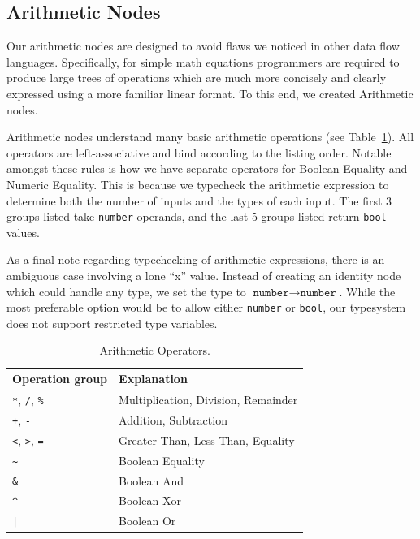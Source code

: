 \documentclass[12pt,UTF8,a4]{article}
\newcommand{\code}[1]{\texttt{#1}}
\newcommand{\type}[1]{\texttt{#1}}
\begin{document}
\clearpage

\subsection{Arithmetic Nodes}
Our arithmetic nodes are designed to avoid flaws we noticed in other
data flow languages. Specifically, for simple math equations
programmers are required to produce large trees of operations which
are much more concisely and clearly expressed using a more familiar
linear format. To this end, we created Arithmetic nodes.

Arithmetic nodes understand many basic arithmetic operations (see
Table~\ref{tab:arithops}). All operators are left-associative and
bind according to the listing order. Notable amongst these rules is
how we have separate operators for Boolean Equality and Numeric
Equality. This is because we typecheck the arithmetic expression to
determine both the number of inputs and the types of each input. The
first 3 groups listed take \type{number} operands, and the last 5
groups listed return \type{bool} values.

As a final note regarding typechecking of arithmetic expressions,
there is an ambiguous case involving a lone ``x'' value. Instead of
creating an identity node which could handle any type, we set the type
to $\type{number} \rightarrow \type{number}$. While the most
preferable option would be to allow either \type{number} or
\type{bool}, our typesystem does not support restricted type
variables.

\begin{table}
\center
\begin{tabular}{l|l}
\hline
Operation group & Explanation \\
\hline
\code{*}, \code{/}, \code{\%} & Multiplication, Division, Remainder \\
\code{+}, \code{-} & Addition, Subtraction \\
\code{\textless}, \code{\textgreater}, \code{=} & Greater Than, Less Than, Equality \\
\code{\textasciitilde} & Boolean Equality \\
\code{\&} & Boolean And \\
\code{\^} & Boolean Xor \\
\code{|} & Boolean Or \\
\hline
\end{tabular}
\caption{Arithmetic Operators.}\label{tab:arithops}
\end{table}
\end{document}
